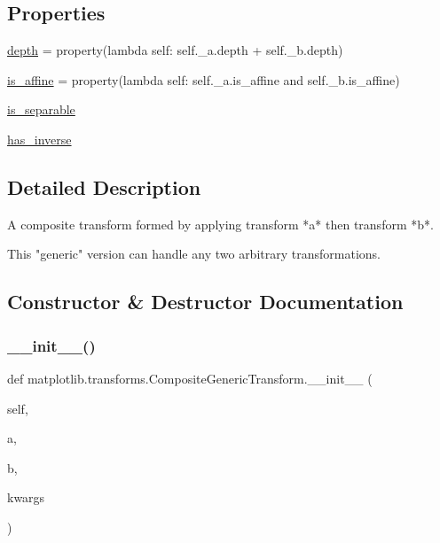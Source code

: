 \subsection*{Properties}
\begin{DoxyCompactItemize}
\item 
\hyperlink{classmatplotlib_1_1transforms_1_1CompositeGenericTransform_a3c5278d362feb676c595fab62be05183}{depth} = property(lambda self\+: self.\+\_\+a.\+depth + self.\+\_\+b.\+depth)
\item 
\hyperlink{classmatplotlib_1_1transforms_1_1CompositeGenericTransform_a2932e83e6124ae21993d1ea78e822a5c}{is\+\_\+affine} = property(lambda self\+: self.\+\_\+a.\+is\+\_\+affine and self.\+\_\+b.\+is\+\_\+affine)
\item 
\hyperlink{classmatplotlib_1_1transforms_1_1CompositeGenericTransform_ad1e427a3197189b337fd6a267033b543}{is\+\_\+separable}
\item 
\hyperlink{classmatplotlib_1_1transforms_1_1CompositeGenericTransform_ad85dc6c211be9db8a732f75a9cb594af}{has\+\_\+inverse}
\end{DoxyCompactItemize}


\subsection{Detailed Description}
\begin{DoxyVerb}A composite transform formed by applying transform *a* then
transform *b*.

This "generic" version can handle any two arbitrary
transformations.
\end{DoxyVerb}
 

\subsection{Constructor \& Destructor Documentation}
\mbox{\label{classmatplotlib_1_1transforms_1_1CompositeGenericTransform_a26d7d367a6588232c9576ad0d7e3f96a}} 
\subsubsection{\texorpdfstring{\+\_\+\+\_\+init\+\_\+\+\_\+()}{\_\_init\_\_()}}
{\footnotesize\ttfamily def matplotlib.\+transforms.\+Composite\+Generic\+Transform.\+\_\+\+\_\+init\+\_\+\+\_\+ (\begin{DoxyParamCaption}\item[{}]{self,  }\item[{}]{a,  }\item[{}]{b,  }\item[{}]{kwargs }\end{DoxyParamCaption})}

